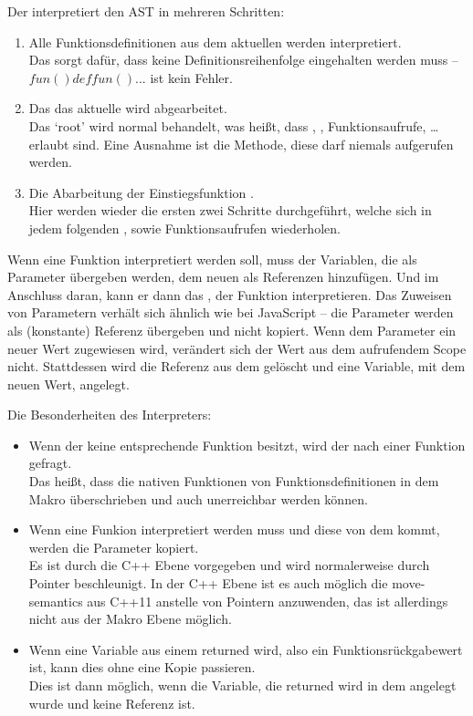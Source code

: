       Der  interpretiert den AST in mehreren Schritten:
      \begin{enumerate}
        \item Alle Funktionsdefinitionen aus dem aktuellen  werden interpretiert.\\
          Das sorgt dafür, dass keine Definitionsreihenfolge eingehalten werden muss -- \myMIn$fun() def fun() {...}$ ist kein Fehler.
        \item Das das aktuelle  wird abgearbeitet.\\
          Das `root'  wird normal behandelt, was heißt, dass , , Funktionsaufrufe, \ldots{} erlaubt sind. Eine Ausnahme ist die  Methode, diese darf niemals aufgerufen werden.
        \item Die Abarbeitung der Einstiegsfunktion .\\
          Hier werden wieder die ersten zwei Schritte durchgeführt, welche sich in jedem folgenden , sowie Funktionsaufrufen wiederholen.
      \end{enumerate}

      Wenn eine Funktion interpretiert werden soll, muss der  Variablen, die als Parameter übergeben werden, dem neuen  als Referenzen hinzufügen. Und im Anschluss daran, kann er dann das , der Funktion interpretieren. Das Zuweisen von Parametern verhält sich ähnlich wie bei JavaScript -- die Parameter werden als (konstante) Referenz übergeben und nicht kopiert. Wenn dem Parameter ein neuer Wert zugewiesen wird, verändert sich der Wert aus dem aufrufendem Scope nicht. Stattdessen wird die Referenz aus dem  gelöscht und eine Variable, mit dem neuen Wert, angelegt.

      Die Besonderheiten des Interpreters:
      \begin{itemize}
        \item Wenn der  keine entsprechende Funktion besitzt, wird der  nach einer Funktion gefragt.\\
          Das heißt, dass die nativen Funktionen von Funktionsdefinitionen in dem Makro überschrieben und auch unerreichbar werden können.
        \item Wenn eine Funkion interpretiert werden muss und diese von dem  kommt, werden die Parameter kopiert.\\
          Es ist durch die C++ Ebene vorgegeben und wird normalerweise durch Pointer beschleunigt. In der C++ Ebene ist es auch möglich die move-semantics aus C++11 anstelle von Pointern anzuwenden, das ist allerdings nicht aus der Makro Ebene möglich.
        \item Wenn eine Variable aus einem  returned wird, also ein Funktionsrückgabewert ist, kann dies ohne eine Kopie passieren.\\
          Dies ist dann möglich, wenn die Variable, die returned wird in dem  angelegt wurde und keine Referenz ist.
      \end{itemize}

